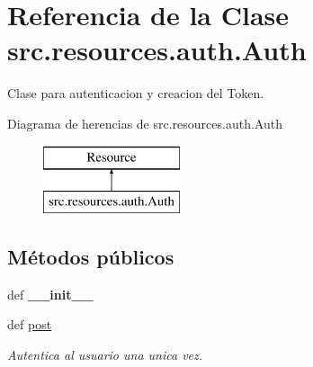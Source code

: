 \hypertarget{classsrc_1_1resources_1_1auth_1_1_auth}{\section{Referencia de la Clase src.\-resources.\-auth.\-Auth}
\label{classsrc_1_1resources_1_1auth_1_1_auth}
}


Clase para autenticacion y creacion del Token.  


Diagrama de herencias de src.\-resources.\-auth.\-Auth\begin{figure}[H]
\begin{center}
\leavevmode
\includegraphics[height=2.000000cm]{classsrc_1_1resources_1_1auth_1_1_auth}
\end{center}
\end{figure}
\subsection*{Métodos públicos}
\begin{DoxyCompactItemize}
\item 
\hypertarget{classsrc_1_1resources_1_1auth_1_1_auth_a2d64661c266e0acecb9f982c74c255bf}{def {\bfseries \-\_\-\-\_\-init\-\_\-\-\_\-}}\label{classsrc_1_1resources_1_1auth_1_1_auth_a2d64661c266e0acecb9f982c74c255bf}

\item 
def \hyperlink{classsrc_1_1resources_1_1auth_1_1_auth_a1dc17d25fd4327120f782367cad81b39}{post}
\begin{DoxyCompactList}\small\item\em Autentica al usuario una unica vez. \end{DoxyCompactList}\end{DoxyCompactItemize}
